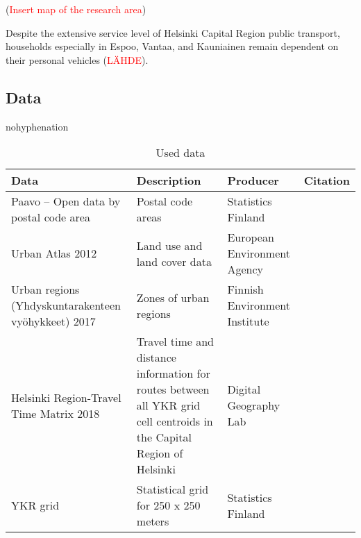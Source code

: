 (\textcolor{red}{Insert map of the research area})

Despite the extensive service level of Helsinki Capital Region public transport, households especially in Espoo, Vantaa, and Kauniainen remain dependent on their personal vehicles (\textcolor{red}{LÄHDE}). 

\subsection{Data}
\justify

\begin{hyphenrules}{nohyphenation}
    \begin{table}[H]
        \centering
        \setlength\tabcolsep{1pt}
        \caption{Used data} 
        \label{tab:useddata}
        \begin{tabular}{ @{} >{\raggedright\arraybackslash}p{4cm} >{\raggedright\arraybackslash}p{4cm} >{\raggedright\arraybackslash}p{4cm} >{\raggedleft\arraybackslash}p{2cm} @{} }
            \toprule
            \cmidrule(r){1-2}
            Data & Description & Producer & Citation \\
            \midrule
            Paavo -- Open data by postal code area & Postal code areas & Statistics Finland & 2 \\
            Urban Atlas 2012 & Land use and land cover data & European Environment Agency & \cite{EuropeanEnvironmentAgency2016Urban2012} \\
            Urban regions (Yhdyskuntarakenteen vyöhykkeet) 2017 & Zones of urban regions & Finnish Environment Institute & 1 \\
            Helsinki Region-Travel Time Matrix 2018 & Travel time and distance information for routes between all YKR grid cell centroids in the Capital Region of Helsinki & Digital Geography Lab & \cite{Tenkanen2018Helsinki2018} \\
            YKR grid & Statistical grid for 250 x 250 meters & Statistics Finland & 2 \\
            \bottomrule
        \end{tabular}
    \end{table} 
\end{hyphenrules}

